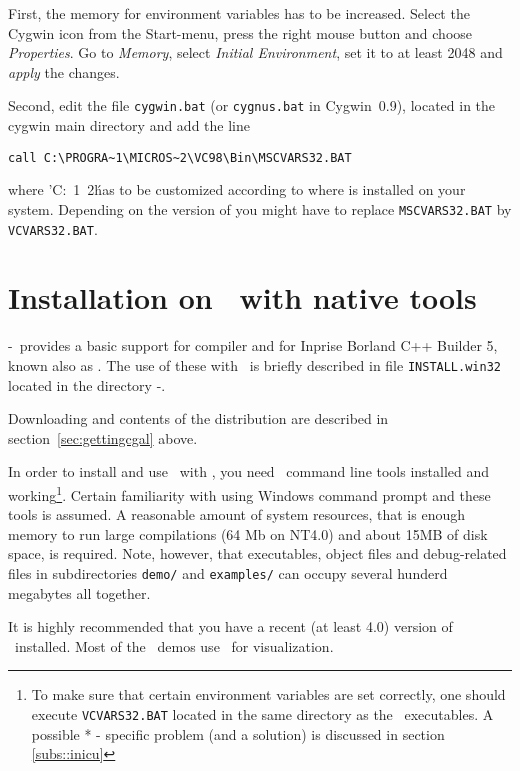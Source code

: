First, the memory for environment variables has to be increased.
Select the Cygwin icon from the Start-menu, press the right mouse
button and choose \textit{Properties}. Go to \textit{Memory}, select
\textit{Initial Environment}, set it to at least 2048 and
\textit{apply} the changes.

Second, edit the file \texttt{cygwin.bat} (or \texttt{cygnus.bat} in
Cygwin~0.9), located in the cygwin main directory and add the line
\begin{verbatim}
call C:\PROGRA~1\MICROS~2\VC98\Bin\MSCVARS32.BAT
\end{verbatim}
where
\nonlinkedpath'C:\PROGRA~1\MICROS~2\'
has to be customized according to where \msvc{} is installed on your
system. Depending on the version of \msvc{} you might have to replace
\texttt{MSCVARS32.BAT} by \texttt{VCVARS32.BAT}.

\section{Installation on \mswin\ with native tools} \label{sec:wininst}

\cgal-\cgalrelease\ provides a basic support for  compiler
and for Inprise Borland C++ Builder 5, known also as .  The
use of these with \cgal\ is briefly described in file
\texttt{INSTALL.win32} located in the directory \cgal-\cgalrelease.

Downloading and contents of the distribution are described in 
section~\ref{sec:gettingcgal} above.

In order to install and use \cgal\ with \msvc , you need \msvc\ 
command line tools installed and working\footnote{To make sure that
  certain environment variables are set correctly, one should execute
  \texttt{VCVARS32.BAT} located in the same directory as the \msvc\ 
  executables. A possible * - specific problem (and a
  solution) is discussed in section \ref{subs::inicu}}. 
Certain familiarity with using Windows command prompt
and these tools is assumed. A reasonable amount of system resources,
that is enough memory to run large compilations (64 Mb on NT4.0) and
about 15MB of disk space, is required. Note, however, that 
executables, object files and debug-related files in subdirectories
\texttt{demo/} and \texttt{examples/} can occupy several hunderd
megabytes all together.

It is highly recommended that you have a recent (at least 4.0) version
of \leda\ installed. Most of the \cgal\ demos use \leda\ for
visualization.


